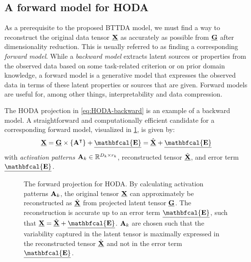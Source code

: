 \subsection{A forward model for HODA}
As a prerequisite to the proposed BTTDA model, we must find a
way to reconstruct the original data tensor $\underline{\mathbf{X}}$ as accurately as possible
from $\underline{\mathbf{G}}$ after dimensionality reduction.
This is usually referred to as finding a corresponding \emph{forward model}.
While a \emph{backward model} extracts latent sources or properties from the observed
data based on some task-related criterion or on prior domain knowledge,
a forward model is a generative model that expresses the observed data in
terms of these latent properties or sources that are given.
Forward models are useful for, among other things, interpretability and data compression.

The HODA projection in \cref{eq:HODA-backward} is an example
of a backward model.
A straightforward and computationally efficient candidate for a corresponding
forward model, visualized in \cref{fig:HODA-forward}, is given by:
\begin{equation}
  \ten{X} = \ten{G}\mmpr{\mat{A}^\intercal} + \ten{\mathbfcal{E}} =
  \hat{\ten{X}} + \ten{\mathbfcal{E}}
	\label{eq:HODA-forward}
\end{equation}
with \emph{activation patterns} $\mathbf{A}_k \in \mathbb{R}^{D_k\times r_k}$,
reconstructed tensor $\hat{\underline{\mathbf{X}}}$, and error term $\ten{\mathbfcal{E}}$.
\begin{figure}[t]
	\centering
	
  \caption[A forward projection for \ac{hoda}.]{The forward projection for HODA.
    By calculating activation patterns $\mathbf{A}_k$, the original tensor $\underline{\mathbf{X}}$ can approximately be
    reconstructed as $\hat{\underline{\mathbf{X}}}$ from projected latent tensor $\underline{\mathbf{G}}$.
    The reconstruction is accurate up to an error term $\ten{\mathbfcal{E}}$,
    such that $\ten{X}=\hat{\ten{X}}+\ten{\mathbfcal{E}}$.
    $\mathbf{A}_k$ are chosen such that the variability captured in the latent tensor is
    maximally expressed in the reconstructed tensor $\hat{\underline{\mathbf{X}}}$ and not in
    the error term $\ten{\mathbfcal{E}}$.}
	\label{fig:HODA-forward}
\end{figure}

